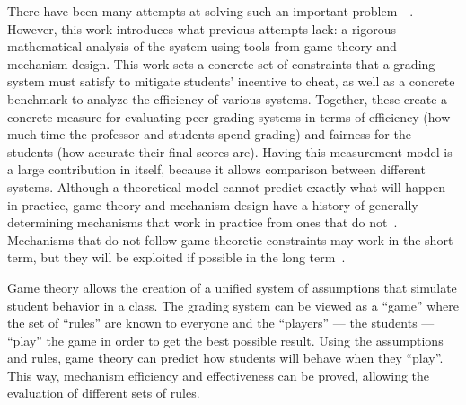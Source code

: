 \documentclass[12pt, Arial]{article}
\begin{document}
There have been many attempts at solving such an important problem~\cite{autograding}~\cite{edxsoftware}. However, this work introduces what previous attempts lack: a rigorous mathematical analysis of the system using tools from game theory and mechanism design. This work sets a concrete set of constraints that a grading system must satisfy to mitigate students' incentive to cheat, as well as a concrete benchmark to analyze the efficiency of various systems. Together, these create a concrete measure for evaluating peer grading systems in terms of efficiency (how much time the professor and students spend grading) and fairness for the students (how accurate their final scores are). Having this measurement model is a large contribution in itself, because it allows comparison between different systems. Although a theoretical model cannot predict exactly what will happen in practice, game theory and mechanism design have a history of generally determining mechanisms that work in practice from ones that do not~\cite{AGTbook}. Mechanisms that do not follow game theoretic constraints may work in the short-term, but they will be exploited if possible in the long term~\cite{boycottfinal}.

Game theory allows the creation of a unified system of assumptions that simulate student behavior in a class. The grading system can be viewed as a ``game'' where the set of ``rules'' are known to everyone and the ``players'' --- the students --- ``play'' the game in order to get the best possible result. Using the assumptions and rules, game theory can predict how students will behave when they ``play''. This way, mechanism efficiency and effectiveness can be proved, allowing the evaluation of different sets of rules.
\end{document}

